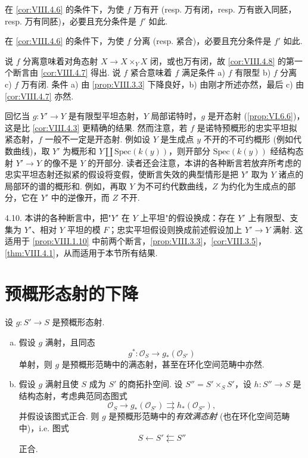 \begin{corollary}\label{cor:VIII.4.7}
在 \ref{cor:VIII.4.6} 的条件下，为使 $f$ 万有开 (resp. 万有闭，resp. 万有嵌入同胚，resp. 万有同胚)，必要且充分条件是 $f'$ 如此.
\end{corollary}

\begin{corollary}\label{cor:VIII.4.8}
在 \ref{cor:VIII.4.6} 的条件下，为使 $f$ 分离 (resp. 紧合)，必要且充分条件是 $f'$ 如此.
\end{corollary}

说 $f$ 分离意味着对角态射 $X \to X \times_Y X$ 闭，或也万有闭，故 \ref{cor:VIII.4.8} 的第一个断言由 \ref{cor:VIII.4.7} 得出. 说 $f$ 紧合意味着 $f$ 满足条件 a) $f$ 有限型 b) $f$ 分离 c) $f$ 万有闭. 条件 a) 由 \ref{prop:VIII.3.3} 下降良好，b) 由刚才所述亦然，最后 c) 由 \ref{cor:VIII.4.7} 亦然.

\begin{remark}\label{rem:VIII.4.9}
回忆当 $g \colon Y' \to Y$ 是有限型平坦态射，$Y$ 局部诺特时，$g$ 是开态射 (\cref{prop:VI.6.6})，这是比 \ref{cor:VIII.4.3} 更精确的结果. 然而注意，若 $f$ 是诺特预概形的忠实平坦拟紧态射，$f$ 一般不一定是开态射. 例如设 $Y$ 是生成点 $y$ 不开的不可约概形 (例如代数曲线)，取 $Y'$ 为概形和 $Y \amalg \mathrm{Spec}(k(y))$，则开部分 $\mathrm{Spec}(k(y))$ 经结构态射 $Y' \to Y$ 的像不是 $Y$ 的开部分. 读者还会注意，本讲的各种断言若放弃所考虑的忠实平坦态射还拟紧的假设将变假，使断言失效的典型情形是把 $Y'$ 取为 $Y$ 诸点的局部环的谱的概形和. 例如，再取 $Y$ 为不可约代数曲线，$Z$ 为约化为生成点的部分，它在 $Y'$ 中的逆像开，而 $Z$ 不开.
\end{remark}

4.10. 本讲的各种断言中，把"$Y'$ 在 $Y$ 上平坦"的假设换成：存在 $Y'$ 上有限型、支集为 $Y'$、相对 $Y$ 平坦的模 $F$；忠实平坦假设则换成前述假设加上 $Y' \to Y$ 满射. 这适用于 \ref{prop:VIII.1.10} 中前两个断言，\ref{prop:VIII.3.3}，\ref{cor:VIII.3.5}，\ref{thm:VIII.4.1}，从而适用于本节所有结果.

\section{预概形态射的下降}

\begin{proposition}\label{prop:VIII.5.1}
设 $g \colon S' \to S$ 是预概形态射.
\begin{enumerate}[a)]
\item 假设 $g$ 满射，且同态
\[
g^{*} \colon \mathcal{O}_S \longrightarrow g_*(\mathcal{O}_{S'})
\]
单射，则 $g$ 是预概形范畴中的满态射，甚至在环化空间范畴中亦然.
\item 假设 $g$ 满射且使 $S$ 成为 $S'$ 的商拓扑空间. 设 $S'' = S' \times_S S'$，设 $h \colon S'' \to S$ 是结构态射，考虑典范同态图式
\[
\mathcal{O}_S \longrightarrow g_*(\mathcal{O}_{S'}) \rightrightarrows h_*(\mathcal{O}_{S''}),
\]
并假设该图式正合. 则 $g$ 是预概形范畴中的\emph{有效满态射} (也在环化空间范畴中)，i.e. 图式
\[
S \longleftarrow S' \leftleftarrows S''
\]
正合.
\end{enumerate}
\end{proposition}

